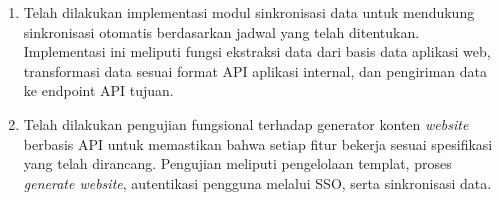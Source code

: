 \begin{enumerate}
    \item Telah dilakukan implementasi modul sinkronisasi data untuk mendukung sinkronisasi otomatis berdasarkan jadwal yang telah ditentukan. Implementasi ini meliputi fungsi ekstraksi data dari basis data aplikasi web, transformasi data sesuai format API aplikasi internal, dan pengiriman data ke endpoint API tujuan.

    \item Telah dilakukan pengujian fungsional terhadap generator konten \textit{website} berbasis API untuk memastikan bahwa setiap fitur bekerja sesuai spesifikasi yang telah dirancang. Pengujian meliputi pengelolaan templat, proses \textit{generate website}, autentikasi pengguna melalui SSO, serta sinkronisasi data.
\end{enumerate}
